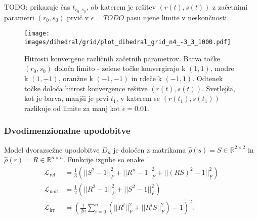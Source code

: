 \documentclass[mat2, tisk]{fmfdelo}
\newcommand{\TODO}[1]{{\color{blue} TODO: #1}}
\newcommand{\R}{\mathbb R}
\newcommand{\Loss}[1]{\mathcal L _\text{#1}}
\begin{document}
        \TODO{} prikazuje čas $t_{r_0, s_0}$, ob katerem je rešitev $(r(t), s(t))$ z začetnimi parametri $(r_0, s_0)$ prvič v $\epsilon = TODO$ pasu njene limite v neskončnosti. 
        \begin{figure}[h!]
            \centering
            \texttt{[image: images/dihedral/grid/plot\_dihedral\_grid\_n4\_-3\_3\_1000.pdf]}
            \caption{Hitrosti konvergenc različnih začetnih parametrov. Barva točke $(r_0,s_0)$ določa limito - zelene točke konvergirajo k $(1,1)$, modre k $(1,-1)$, oranžne k $(-1,-1)$ in rdeče k $(-1,1)$. Odtenek točke določa hitrost konvergence rešitve $(r(t), s(t))$. Svetlejša, kot je barva, manjši je prvi $t_1$, v katerem se $(r(t_1), s(t_1))$ razlikuje od limite za manj kot $\epsilon = 0.01$.}
            \label{fig:enter-label}
        \end{figure}
        \subsubsection{Dvodimenzionalne upodobitve}
        Model dvorazsežne upodobitve $D_n$ je določen z matrikama $\hat \rho(s) = S \in \R^{2\times 2}$ in $\hat \rho(r) = R \in \R^{n \times n}$. Funkcije izgube so enake 
        \begin{align*}
            \Loss{rel} &= \frac{1}{3} \left( ||S^2 -1||_F^2 + ||R^n -1||_F^2  + ||(RS)^2 -1||_F^2  \right )\\
            \Loss{unit} &=  \frac{1}{2} \left ( ||R^2 -1||_F^2 + ||S ^2 -1||_F^2  \right)  \\
            \Loss{irr} &= \left ( \frac{1}{2n}\sum_{i=0}^n(||R^i||_F^2 + ||R^iS||_F^2)    - 1\right )^2.
        \end{align*}
\end{document}
